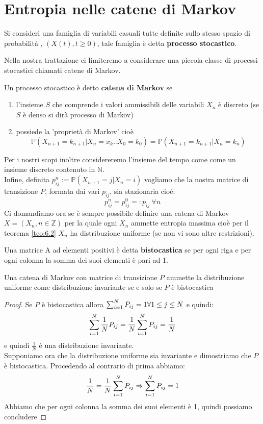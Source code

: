 \section{Entropia nelle catene di Markov}
\label{sec:markEntropia}
\begin{defi}
Si consideri una famiglia di variabili casuali tutte definite sullo stesso spazio di probabilità \spacep , $(X(t), t \geq 0 )$, tale famiglia è detta \textbf{processo stocastico}.
\end{defi}
Nella nostra trattazione ci limiteremo a considerare una piccola classe di processi stocastici chiamati catene di Markov.
\begin{defi} \label{defi:cateMarkov}
Un processo stocastico è detto \textbf{catena di Markov} se 
\begin{enumerate}
\item l'insieme $S$ che comprende i valori ammissibili delle variabili $X_n$ è discreto (se $S$ è denso si dirà processo di Markov)
\item possiede la 'proprietà di Markov' cioè
 $$\mathbb{P}(X_{n+1}=k_{n+1}|X_n=x_k..X_0=k_0)=\mathbb{P}(X_{n+1}=k_{n+1} | X_n=k_n)$$
\end{enumerate}
\end{defi}
Per i nostri scopi inoltre considereremo l'insieme del tempo come come un insieme discreto contenuto in $\mathbb{N}$.\\
Infine, definita $p_{ij}^n:=\mathbb{P}(X_{n+1}=j|X_n=i)$ vogliamo che la nostra matrice di transizione $P$, formata dai vari $p_{ij}$, sia stazionaria cioè:\\
$$p_{ij}^n=p_{ij}^0=: p_{ij} \  \forall n$$
Ci domandiamo ora se è sempre possibile definire una catena di Markov $X=(X_n,n\in\mathbb{Z})$ per la quale ogni $X_n$ ammette entropia massima cioè per il teorema \ref{teo:6.2} $X_n$ ha distribuzione uniforme (se non vi sono altre restrizioni).
\begin{defi}
Una matrice A ad elementi positivi è detta \textbf{bistocastica} se per ogni riga e per ogni colonna la somma dei suoi elementi è pari ad 1.
\end{defi}
\begin{teo}
Una catena di Markov con matrice di transizione $P$ ammette la distribuzione uniforme come distribuzione invariante se e solo se $P$ è bistocastica
\end{teo}
\begin{proof}
Se $P$ è bistocastica allora $ \sum_{i=1}^N P_{ij}=1 \forall 1\leq j \leq N$ e quindi:
$$\sum_{i=1}^N \frac{1}{N}P_{ij}=\frac{1}{N}\sum_{i=1}^N P_{ij}=\frac{1}{N}$$
e quindi $\frac{1}{N}$ è una distribuzione invariante.\\
Supponiamo ora che la distribuzione uniforme sia invariante e dimostriamo che $P$ è bistocastica. Procedendo al contrario di prima abbiamo:
$$\frac{1}{N}=\frac{1}{N} \sum_{i=1}^N P_{ij} \Rightarrow \sum_{i=1}^N P_{ij}=1$$
Abbiamo che per ogni colonna la somma dei suoi elementi è 1, quindi possiamo concludere
\end{proof}

